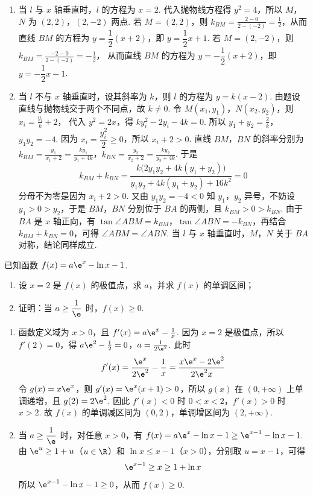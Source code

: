 \begin{solution}
\begin{enumerate}
\item 当 \(l\) 与 \(x\) 轴垂直时，\(l\) 的方程为 \(x=2\). 代入抛物线方程得 \(y^2=4\)，所以 \(M\)，\(N\) 为 \((2,2)\)，\((2,-2)\) 两点. 若 \(M=(2,2)\)，则
\(k_{BM}=\frac{2-0}{2-(-2)}=\frac12\)，从而直线 \(BM\) 的方程为 \(y=\dfrac12(x+2)\)，即 \(y=\dfrac12x+1\). 若 \(M=(2,-2)\)，则 \(k_{BM}=\frac{-2-0}{2-(-2)}=-\frac12\)，
从而直线 \(BM\) 的方程为 \(y=-\dfrac12(x+2)\)，即 \(y=-\dfrac12x-1\).
\item 当 \(l\) 不与 \(x\) 轴垂直时，设其斜率为 \(k\)，则 \(l\) 的方程为 \(y=k(x-2)\). 由题设直线与抛物线交于两个不同点，故 \(k\neq0\). 令 \(M(x_1,y_1)\)，\(N(x_2,y_2)\)，则
\(x_i=\frac{y_i}{k}+2\)，
代入 \(y^2=2x\)，得 \(ky_i^2-2y_i-4k=0\). 所以
\(y_1+y_2=\frac2k\)，\(y_1y_2=-4\).
因为 \(x_i=\dfrac{y_i^2}{2}\geq0\)，所以 \(x_i+2>0\). 直线 \(BM\)，\(BN\) 的斜率分别为
\(k_{BM}=\frac{y_1}{x_1+2}=\frac{ky_1}{y_1+4k}\)，\(k_{BN}=\frac{y_2}{x_2+2}=\frac{ky_2}{y_2+4k}\).
于是
\[
k_{BM}+k_{BN}
=\frac{k\bigl(2y_1y_2+4k(y_1+y_2)\bigr)}
{y_1y_2+4k(y_1+y_2)+16k^2}=0
\]
分母不为零是因为 \(x_i+2>0\). 又由 \(y_1y_2=-4<0\) 知 \(y_1\)，\(y_2\) 异号，不妨设 \(y_1>0>y_2\)，于是 \(BM\)，\(BN\) 分别位于 \(BA\) 的两侧，且 \(k_{BM}>0>k_{BN}\). 由于 \(BA\) 是 \(x\) 轴正向，有 \(\tan\angle ABM=k_{BM}\)，\(\tan\angle ABN=-k_{BN}\)，再结合 \(k_{BM}+k_{BN}=0\)，可得 \(\angle ABM=\angle ABN\). 当 \(l\) 与 \(x\) 轴垂直时，\(M\)，\(N\) 关于 \(BA\) 对称，结论同样成立.
\end{enumerate}
\end{solution}

\begin{problem}
已知函数 \(f(x)=a\e^x-\ln x-1\).

\begin{enumerate}
\item 设 \(x=2\) 是 \(f(x)\) 的极值点，求 \(a\)，并求 \(f(x)\) 的单调区间；
\item 证明：当 \(a\ge\dfrac1\e\) 时，\(f(x)\ge0\).
\end{enumerate}
\end{problem}

\begin{solution}
\begin{enumerate}
\item 函数定义域为 \(x>0\)，且
\(f'(x)=a\e^x-\frac1x\).
因为 \(x=2\) 是极值点，所以 \(f'(2)=0\)，得
\(a\e^2-\frac12=0\)，\(a=\frac{1}{2\e^2}\).
此时
\[
f'(x)=\frac{\e^x}{2\e^2}-\frac1x
=\frac{x\e^x-2\e^2}{2\e^2x}
\]
令 \(g(x)=x\e^x\)，则 \(g'(x)=\e^x(x+1)>0\)，所以 \(g(x)\) 在 \((0,+\infty)\) 上单调递增，且 \(g(2)=2\e^2\). 因此 \(f'(x)<0\) 时 \(0<x<2\)，\(f'(x)>0\) 时 \(x>2\). 故 \(f(x)\) 的单调减区间为 \((0,2)\)，单调增区间为 \((2,+\infty)\).
\item 当 \(a\geq\dfrac1\e\) 时，对任意 \(x>0\)，有
\(f(x)=a\e^x-\ln x-1\geq\e^{x-1}-\ln x-1\).
由 \( \e^u\geq1+u\)（\(u\in\R\)）和 \(\ln x\leq x-1\)（\(x>0\)），分别取 \(u=x-1\)，可得
\[
\e^{x-1}\geq x\geq1+\ln x
\]
所以 \(\e^{x-1}-\ln x-1\geq0\)，从而 \(f(x)\geq0\).
\end{enumerate}
\end{solution}

